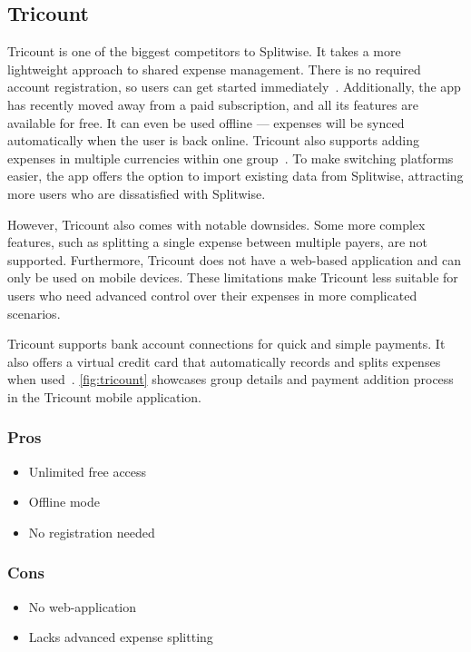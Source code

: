 \documentclass{ctuthesis}
\begin{document}
\subsection{Tricount}
Tricount is one of the biggest competitors to Splitwise. It takes a more lightweight approach to shared expense management. There is no required account registration, so users can get started immediately~\cite{Tri1}. Additionally, the app has recently moved away from a paid subscription, and all its features are available for free. It can even be used offline — expenses will be synced automatically when the user is back online. Tricount also supports adding expenses in multiple currencies within one group~\cite{Tri2}. To make switching platforms easier, the app offers the option to import existing data from Splitwise, attracting more users who are dissatisfied with Splitwise. 

However, Tricount also comes with notable downsides. Some more complex features, such as splitting a single expense between multiple payers, are not supported. Furthermore, Tricount does not have a web-based application and can only be used on mobile devices. These limitations make Tricount less suitable for users who need advanced control over their expenses in more complicated scenarios.

Tricount supports bank account connections for quick and simple payments. It also offers a virtual credit card that automatically records and splits expenses when used~\cite{Tri3}. \autoref{fig:tricount} showcases group details and payment addition process in the Tricount mobile application.

\subsubsection{Pros}
\begin{itemize}
    \item Unlimited free access
    \item Offline mode
    \item No registration needed
\end{itemize}

\subsubsection{Cons}
\begin{itemize}
    \item No web-application
    \item Lacks advanced expense splitting
\end{itemize}
\end{document}
